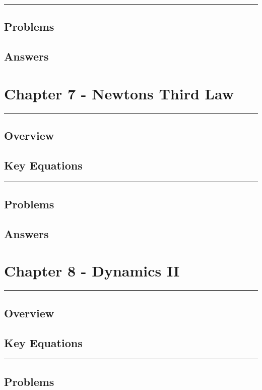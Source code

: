 \documentclass[a4paper,12pt]{article}
\begin{document}
\begin{center}
  \rule{6cm}{0.5pt}
\end{center}
\subsection*{Problems}
\subsection*{Answers}

\pagebreak
\section*{Chapter 7 - Newtons Third Law}
\rule{\linewidth}{1pt}
\subsection*{Overview}
\subsection*{Key Equations}

\begin{center}
  \rule{6cm}{0.5pt}
\end{center}
\subsection*{Problems}
\subsection*{Answers}

\pagebreak
\section*{Chapter 8 - Dynamics II}
\rule{\linewidth}{1pt}
\subsection*{Overview}
\subsection*{Key Equations}

\begin{center}
  \rule{6cm}{0.5pt}
\end{center}
\subsection*{Problems}
\end{document}

